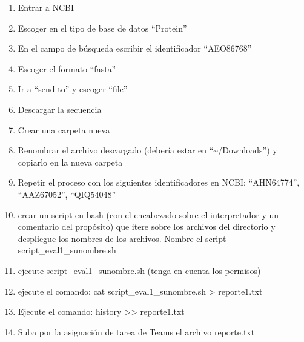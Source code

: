 \documentclass[letterpaper,10pt,english]{jupyterBook}
\begin{document}
\begin{enumerate}
%
\item {} 
\sphinxAtStartPar
Entrar a NCBI 

\item {} 
\sphinxAtStartPar
Escoger en el tipo de base de datos “Protein”

\item {} 
\sphinxAtStartPar
En el campo de búsqueda escribir el identificador “AEO86768”

\item {} 
\sphinxAtStartPar
Escoger el formato “fasta”

\item {} 
\sphinxAtStartPar
Ir a “send to” y escoger “file”

\item {} 
\sphinxAtStartPar
Descargar la secuencia

\item {} 
\sphinxAtStartPar
Crear una carpeta nueva

\item {} 
\sphinxAtStartPar
Renombrar el archivo descargado (debería estar en “\textasciitilde{}/Downloads”) y copiarlo en la nueva carpeta

\item {} 
\sphinxAtStartPar
Repetir el proceso con los siguientes identificadores en NCBI: “AHN64774”, “AAZ67052”, “QIQ54048”

\item {} 
\sphinxAtStartPar
crear un script en bash (con el encabezado sobre el interpretador y un comentario del propósito) que itere sobre los archivos del directorio y despliegue los nombres de los archivos. Nombre el script script\_eval1\_sunombre.sh

\item {} 
\sphinxAtStartPar
ejecute script\_eval1\_sunombre.sh (tenga en cuenta los permisos)

\item {} 
\sphinxAtStartPar
ejecute el comando: cat script\_eval1\_sunombre.sh > reporte1.txt

\item {} 
\sphinxAtStartPar
Ejecute el comando: history >> reporte1.txt

\item {} 
\sphinxAtStartPar
Suba por la asignación de tarea de Teams el archivo reporte.txt

\end{enumerate}









\renewcommand{\indexname}{Index}
\printindex
\end{document}
